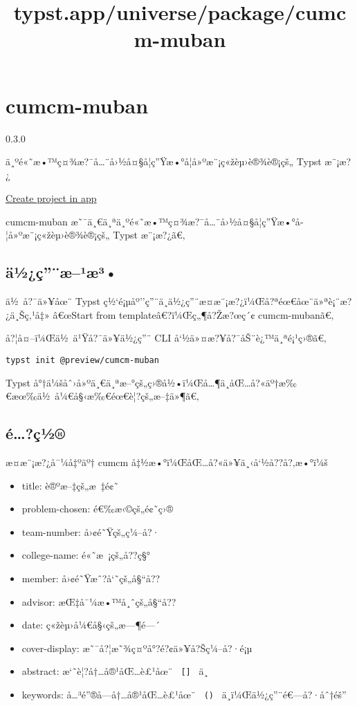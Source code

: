 \title{typst.app/universe/package/cumcm-muban}

\label{banner}
\label{template-thumbnail}

\section{cumcm-muban}\label{cumcm-muban}

{ 0.3.0 }

ä¸ºé«˜æ•™ç¤¾æ?¯å\ldots¨å›½å¤§å­¦ç''Ÿæ•°å­¦å»ºæ¨¡ç«žèµ›è®¾è®¡çš„ Typst
æ¨¡æ?¿

\href{/app?template=cumcm-muban&version=0.3.0}{Create project in app}

\label{readme}
cumcm-muban
æ˜¯ä¸€ä¸ªä¸ºé«˜æ•™ç¤¾æ?¯å\ldots¨å›½å¤§å­¦ç''Ÿæ•°å­¦å»ºæ¨¡ç«žèµ›è®¾è®¡çš„
Typst æ¨¡æ?¿ã€‚

\subsection{ä½¿ç''¨æ--¹æ³•}\label{uxe4uxbduxe7uxe6uxb9uxe6uxb3}

ä½~å?¯ä»¥åœ¨ Typst
ç½`é¡µåº''ç''¨ä¸­ä½¿ç''¨æ­¤æ¨¡æ?¿ï¼Œå?ªéœ€åœ¨ä»ªè¡¨æ?¿ä¸Šç‚¹å‡» â€œStart
from templateâ€?ï¼Œç„¶å?Žæ?œç´¢ cumcm-mubanã€‚

å?¦å¤--ï¼Œä½~ä¹Ÿå?¯ä»¥ä½¿ç''¨ CLI å`½ä»¤æ?¥å?¯åŠ¨è¿™ä¸ªé¡¹ç›®ã€‚

\begin{verbatim}
typst init @preview/cumcm-muban
\end{verbatim}

Typst
å°†ä¼šåˆ›å»ºä¸€ä¸ªæ--°çš„ç›®å½•ï¼Œå\ldots¶ä¸­åŒ\ldots å?«äº†æ‰€æœ‰ä½~å¼€å§‹æ‰€éœ€è¦?çš„æ--‡ä»¶ã€‚

\subsection{é\ldots?ç½®}\label{uxe9uxe7uxbd}

æ­¤æ¨¡æ?¿å¯¼å‡ºäº† cumcm å‡½æ•°ï¼ŒåŒ\ldots å?«ä»¥ä¸‹å`½å??å?‚æ•°ï¼š

\begin{itemize}
\tightlist
\item
  title: è®ºæ--‡çš„æ~‡é¢˜
\item
  problem-chosen: é€‰æ‹©çš„é¢˜ç›®
\item
  team-number: å›¢é˜Ÿçš„ç¼--å?·
\item
  college-name: é«˜æ~¡çš„å??ç§°
\item
  member: å›¢é˜Ÿæˆ?å`˜çš„å§``å??
\item
  advisor: æŒ‡å¯¼æ•™å¸ˆçš„å§``å??
\item
  date: ç«žèµ›å¼€å§‹çš„æ---¶é---´
\item
  cover-display: æ˜¯å?¦æ˜¾ç¤ºå°?é?¢ä»¥å?Šç¼--å?·é¡µ
\item
  abstract: æ`˜è¦?å†\ldots å®¹åŒ\ldots è£¹åœ¨ \texttt{\ {[}{]}\ } ä¸­
\item
  keywords: å\ldots³é''®å­---å†\ldots å®¹åŒ\ldots è£¹åœ¨ \texttt{\ ()\ }
  ä¸­ï¼Œä½¿ç''¨é€---å?·åˆ†éš''
\end{itemize}

